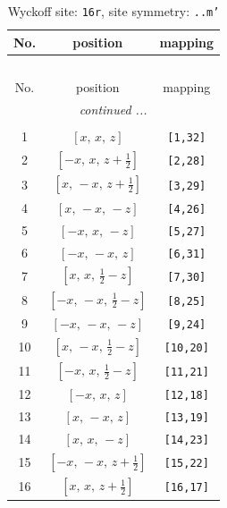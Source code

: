\documentclass[fleqn,8pt]{jsarticle}
\begin{document}
\renewcommand{\arraystretch}{1.2}
\begin{longtable}{ccc}
\caption{Wyckoff site: {\tt 16r}, site symmetry: {\tt ..m'}}
 \\
 \hline \hline
No. & position & mapping \\ \hline \endfirsthead

\multicolumn{2}{l}{\tablename\ \thetable{}} \\
 \hline \hline
No. & position & mapping \\ \hline \endhead

 \hline \hline
\multicolumn{2}{r}{\footnotesize\it continued ...} \\ \endfoot

 \hline \hline
\multicolumn{2}{r}{} \\ \endlastfoot

1 & $\left[ x,\, x,\, z \right]$ & {\tt [1,32]} \\ \hline
2 & $\left[ - x,\, x,\, z + \frac{1}{2} \right]$ & {\tt [2,28]} \\ \hline
3 & $\left[ x,\, - x,\, z + \frac{1}{2} \right]$ & {\tt [3,29]} \\ \hline
4 & $\left[ x,\, - x,\, - z \right]$ & {\tt [4,26]} \\ \hline
5 & $\left[ - x,\, x,\, - z \right]$ & {\tt [5,27]} \\ \hline
6 & $\left[ - x,\, - x,\, z \right]$ & {\tt [6,31]} \\ \hline
7 & $\left[ x,\, x,\, \frac{1}{2} - z \right]$ & {\tt [7,30]} \\ \hline
8 & $\left[ - x,\, - x,\, \frac{1}{2} - z \right]$ & {\tt [8,25]} \\ \hline
9 & $\left[ - x,\, - x,\, - z \right]$ & {\tt [9,24]} \\ \hline
10 & $\left[ x,\, - x,\, \frac{1}{2} - z \right]$ & {\tt [10,20]} \\ \hline
11 & $\left[ - x,\, x,\, \frac{1}{2} - z \right]$ & {\tt [11,21]} \\ \hline
12 & $\left[ - x,\, x,\, z \right]$ & {\tt [12,18]} \\ \hline
13 & $\left[ x,\, - x,\, z \right]$ & {\tt [13,19]} \\ \hline
14 & $\left[ x,\, x,\, - z \right]$ & {\tt [14,23]} \\ \hline
15 & $\left[ - x,\, - x,\, z + \frac{1}{2} \right]$ & {\tt [15,22]} \\ \hline
16 & $\left[ x,\, x,\, z + \frac{1}{2} \right]$ & {\tt [16,17]} \\
\end{longtable}
\end{document}
